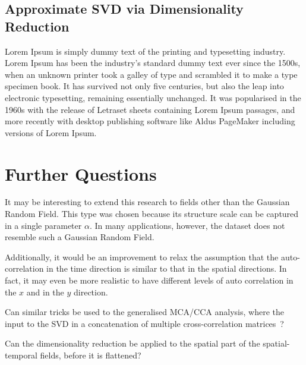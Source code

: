 \documentclass{acm_proc_article-sp}
\begin{document}
\subsection{Approximate SVD via Dimensionality Reduction}
\label{sec:Applications Approximate SVD via Dimensionality Reduction}

Lorem Ipsum is simply dummy text of the printing and typesetting industry. Lorem Ipsum has been the industry's standard dummy text ever since the 1500s, when an unknown printer took a galley of type and scrambled it to make a type specimen book. It has survived not only five centuries, but also the leap into electronic typesetting, remaining essentially unchanged. It was popularised in the 1960s with the release of Letraset sheets containing Lorem Ipsum passages, and more recently with desktop publishing software like Aldus PageMaker including versions of Lorem Ipsum.

\section{Further Questions}
\label{Further Questions}

It may be interesting to extend this research to fields other than the Gaussian Random Field. This type was chosen because its structure scale can be captured in a single parameter $\alpha$. In many applications, however, the dataset does not resemble such a Gaussian Random Field.

Additionally, it would be an improvement to relax the assumption that the auto-correlation in the time direction is similar to that in the spatial directions. In fact, it may even be more realistic to have different levels of auto correlation in the $x$ and in the $y$ direction.

Can similar tricks be used to the generalised MCA/CCA analysis, where the input to the SVD in a concatenation of multiple cross-correlation matrices~\cite{Carroll1970, Kettenring1971}?

Can the dimensionality reduction be applied to the spatial part of the spatial-temporal fields, before it is flattened?

{
\footnotesize


}
\end{document}
